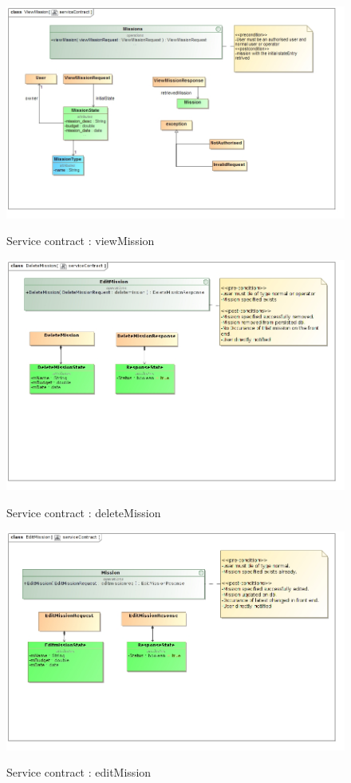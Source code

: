 \documentclass{article}
\begin{document}
		\begin{figure}[H]
				\includegraphics[width=\textwidth]{serviceContract_viewmission.jpg}  \\
				\caption{Service contract : viewMission}
				\end{figure}
				
		\begin{figure}[H]
				\includegraphics[width=\textwidth]{DeleteMission serviceContract.jpg}  \\
				\caption{Service contract : deleteMission}
				\end{figure}
		\begin{figure}[H]
				\includegraphics[width=\textwidth]{Edit Mission serviceContract.jpg}  \\
				\caption{Service contract : editMission}
				\end{figure}
				
\end{document}

